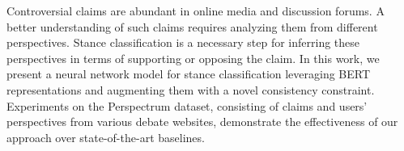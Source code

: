 Controversial claims are abundant in online media and discussion forums. A better understanding of such claims requires analyzing them from different perspectives. Stance classification is a necessary step for inferring these perspectives in terms of supporting or opposing the claim. In this work, we present a neural network model for stance classification leveraging BERT representations and augmenting them with a novel consistency constraint. Experiments on the Perspectrum dataset, consisting of claims and users' perspectives from various debate websites, demonstrate the effectiveness of our approach over state-of-the-art baselines.